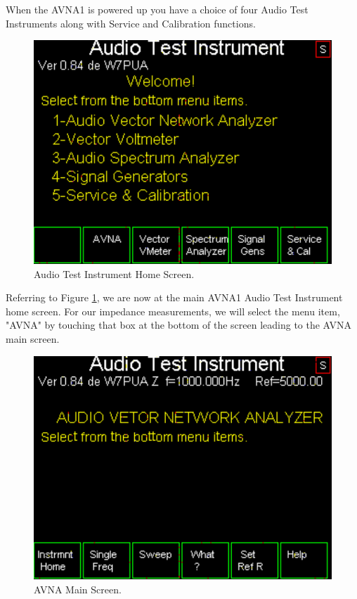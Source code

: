 When the AVNA1 is powered up you have a choice of four Audio Test Instruments along with Service and Calibration functions.
\begin{figure}[H]
\begin{center}
\includegraphics[scale=0.75]{./images/AVNA_000.pdf}
\caption{Audio Test Instrument Home  Screen.}
\label{AVNA_000-label}
\end{center}
\end{figure}
%
Referring to Figure \ref{AVNA_000-label}, we are now at the main AVNA1 Audio Test Instrument home screen.  For our impedance measurements, we will select the menu item, "\textsf{AVNA}" by touching that box at the bottom of the screen leading to the AVNA main screen.
\begin{figure}[H]
\begin{center}
\includegraphics[scale=0.75]{./images/AVNA_001.pdf}
\caption{AVNA Main  Screen.}
\label{AVNA_001-label}
\end{center}
\end{figure}
